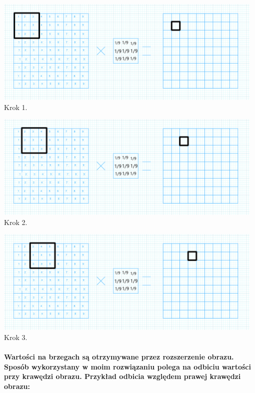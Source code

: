 \documentclass[a4paper,12pt,openany]{report}
\begin{document}
\begin{center}
\includegraphics[width=13cm]{resources/blur1.png}
\linebreak
\tiny{Krok 1.}
\end{center}

\begin{center}
\includegraphics[width=13cm]{resources/blur2.png}
\linebreak
\tiny{Krok 2.}
\end{center}

\begin{center}
\includegraphics[width=13cm]{resources/blur3.png}
\linebreak
\tiny{Krok 3.}
\end{center}


\pagebreak
\paragraph{\indent Wartości na brzegach są otrzymywane przez rozszerzenie obrazu. Sposób wykorzystany w moim rozwiązaniu polega na odbiciu wartości przy krawędzi obrazu. Przykład odbicia względem prawej krawędzi obrazu:}
\end{document}
